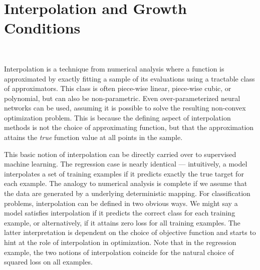 
\chapter{Interpolation and Growth Conditions}~\label{ch:interpolation-gc}

Interpolation is a technique from numerical analysis where a function is approximated by exactly fitting a sample of its evaluations using a tractable class of approximators. 
This class is often piece-wise linear, piece-wise cubic, or polynomial, but can also be non-parametric. 
Even over-parameterized neural networks can be used, assuming it is possible to solve the resulting non-convex optimization problem. 
This is because the defining aspect of interpolation methods is not the choice of approximating function, but that the approximation attains the \emph{true} function value at all points in the sample.


This basic notion of interpolation can be directly carried over to supervised machine learning.  
The regression case is nearly identical --- intuitively, a model interpolates a set of training examples if it predicts exactly the true target for each example. 
The analogy to numerical analysis is complete if we assume that the data are generated by a underlying deterministic mapping.
For classification problems, interpolation can be defined in two obvious ways. 
We might say a model satisfies interpolation if it predicts the correct class for each training example, or alternatively, if it attains zero loss for all training examples.  
The latter interpretation is dependent on the choice of objective function and starts to hint at the role of interpolation in optimization.
Note that in the regression example, the two notions of interpolation coincide for the natural choice of squared loss on all examples.

